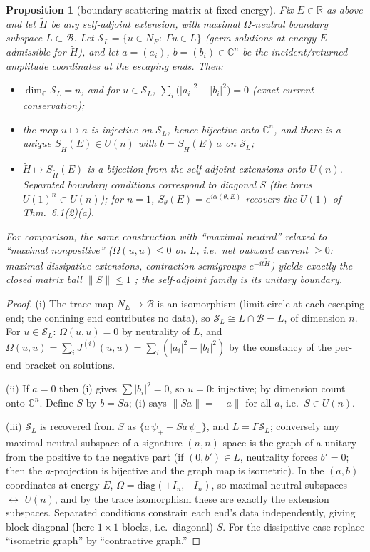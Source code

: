 \documentclass[11pt]{article}
\newtheorem{proposition}[theorem]{Proposition}
\theoremstyle{remark}
\newcommand{\C}{\mathbb{C}}
\newcommand{\R}{\mathbb{R}}
\begin{document}
\begin{proposition}[boundary scattering matrix at fixed energy]
\label{prop:S}
Fix $E\in\R$ as above and let $\tilde H$ be any self-adjoint extension,
with maximal $\Omega$-neutral boundary subspace
$L\subset\mathcal B$.  Let
$\mathcal S_L=\{u\in N_E:\ \Gamma u\in L\}$ (germ solutions at energy
$E$ admissible for $\tilde H$), and let $a=(a_i)$, $b=(b_i)\in\C^n$ be
the incident/returned amplitude coordinates at the escaping ends.
Then:
\begin{itemize}
\item[(i)] $\dim_\C\mathcal S_L=n$, and for $u\in\mathcal S_L$,
$\sum_i\bigl(|a_i|^2-|b_i|^2\bigr)=0$ \emph{(exact current
conservation)};
\item[(ii)] the map $u\mapsto a$ is injective on $\mathcal S_L$, hence
bijective onto $\C^n$, and there is a unique
$S_{\tilde H}(E)\in U(n)$ with $b=S_{\tilde H}(E)\,a$ on
$\mathcal S_L$;
\item[(iii)] $\tilde H\mapsto S_{\tilde H}(E)$ is a bijection from the
self-adjoint extensions onto $U(n)$.  Separated boundary conditions
correspond to diagonal $S$ (the torus $U(1)^n\subset U(n)$); for $n=1$,
$S_\theta(E)=e^{i\alpha(\theta,E)}$ recovers the $U(1)$ of
Thm.~6.1(2)(a).
\end{itemize}
For comparison, the same construction with ``maximal neutral''
relaxed to ``maximal nonpositive'' ($\Omega(u,u)\le0$ on $L$, i.e.\
net outward current $\ge0$: maximal-dissipative extensions, contraction
semigroups $e^{-it\tilde H}$) yields exactly the closed matrix ball
$\|S\|\le1$ \cite{BHS}; the self-adjoint family is its unitary
boundary.
\end{proposition}

\begin{proof}
(i) The trace map $N_E\to\mathcal B$ is an isomorphism (limit circle at
each escaping end; the confining end contributes no data), so
$\mathcal S_L\cong L\cap\mathcal B=L$, of dimension $n$.  For
$u\in\mathcal S_L$: $\Omega(u,u)=0$ by neutrality of $L$, and
$\Omega(u,u)=\sum_i J^{(i)}(u,u)=\sum_i(|a_i|^2-|b_i|^2)$ by the
constancy of the per-end bracket on solutions.

(ii) If $a=0$ then (i) gives $\sum|b_i|^2=0$, so $u=0$: injective;
by dimension count onto $\C^n$.  Define $S$ by $b=Sa$; (i) says
$\|Sa\|=\|a\|$ for all $a$, i.e.\ $S\in U(n)$.

(iii) $\mathcal S_L$ is recovered from $S$ as
$\{a\,\psi_++Sa\,\psi_-\}$, and $L=\Gamma\mathcal S_L$; conversely any
maximal neutral subspace of a signature-$(n,n)$ space is the graph of a
unitary from the positive to the negative part (if $(0,b')\in L$,
neutrality forces $b'=0$; then the $a$-projection is bijective and the
graph map is isometric).  In the $(a,b)$ coordinates at energy $E$,
$\Omega=\mathrm{diag}(+I_n,-I_n)$, so maximal neutral subspaces
$\leftrightarrow$ $U(n)$, and by the trace isomorphism these are
exactly the extension subspaces.  Separated conditions constrain each
end's data independently, giving block-diagonal (here $1\times1$
blocks, i.e.\ diagonal) $S$.  For the dissipative case replace
``isometric graph'' by ``contractive graph.''
\end{proof}
\end{document}
